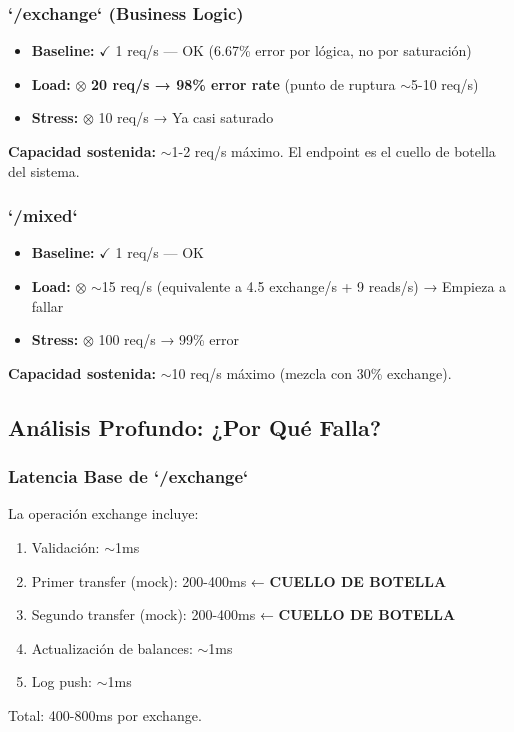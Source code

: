 \subsubsection{`/exchange` (Business Logic)}
\begin{itemize}
    \item \textbf{Baseline:} $\checkmark$ 1 req/s — OK (6.67\% error por lógica, no por saturación)
    \item \textbf{Load:} $\otimes$ \textbf{20 req/s → 98\% error rate} (punto de ruptura $\sim$5-10 req/s)
    \item \textbf{Stress:} $\otimes$ 10 req/s → Ya casi saturado
\end{itemize}
\textbf{Capacidad sostenida:} $\sim$1-2 req/s máximo. El endpoint es el cuello de botella del sistema.

\subsubsection{`/mixed`}
\begin{itemize}
    \item \textbf{Baseline:} $\checkmark$ 1 req/s — OK
    \item \textbf{Load:} $\otimes$ $\sim$15 req/s (equivalente a 4.5 exchange/s + 9 reads/s) → Empieza a fallar
    \item \textbf{Stress:} $\otimes$ 100 req/s → 99\% error
\end{itemize}
\textbf{Capacidad sostenida:} $\sim$10 req/s máximo (mezcla con 30\% exchange).

\subsection{Análisis Profundo: ¿Por Qué Falla?}

\subsubsection{Latencia Base de `/exchange`}
La operación exchange incluye:
\begin{enumerate}
    \item Validación: $\sim$1ms
    \item Primer transfer (mock): 200-400ms ← \textbf{CUELLO DE BOTELLA}
    \item Segundo transfer (mock): 200-400ms ← \textbf{CUELLO DE BOTELLA}
    \item Actualización de balances: $\sim$1ms
    \item Log push: $\sim$1ms
\end{enumerate}
Total: 400-800ms por exchange.

